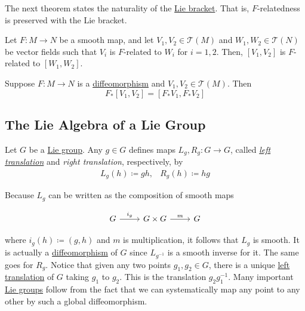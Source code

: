 \documentclass{article}
\newcounter{theorem}[section]
\newcounter{definition}[section]
\begin{document}
    The next theorem states the naturality of the \hyperref[def:lie-bracket]{Lie bracket}. That is, $F$-relatedness is preserved with the Lie bracket. 

    \begin{theorem}
      \label{thm:lie-brackets-respect-f-relatedness}
      Let $F: M \to N$ be a smooth map, and let $V_1, V_2 \in \mathcal{T} (M)$ and $W_1, W_2 \in \mathcal{T}(N)$ be vector fields such that $V_i$ is $F$-related to $W_i$ for $i = 1, 2$. Then, $[V_1, V_2]$ is $F$-related to $[W_1, W_2]$. 
    \end{theorem}

    \begin{corollary}
      \label{thm:diffeomorphisms-preserve-lie-brackets}
      Suppose $F: M \to N$ is a \hyperref[def:diffeomorphism-2]{diffeomorphism} and $V_1, V_2 \in \mathcal{T}(M)$. Then 
        \begin{equation}
          F_* [V_1, V_2] = [F_* V_1, F_* V_2]
        \end{equation}
    \end{corollary}

  \subsection{The Lie Algebra of a Lie Group}

    \begin{definition}
      \label{def:left-and-right-translation}
      Let $G$ be a \hyperref[def:lie-group]{Lie group}. Any $g \in G$ defines maps $L_g, R_g : G \to G$, called \textit{\hyperref[def:left-and-right-translation]{left translation}} and \textit{right translation}, respectively, by 
      \begin{align*}
        L_g (h) \coloneqq g h , & R_g (h) \coloneqq h g
      \end{align*}
    \end{definition}

    Because $L_g$ can be written as the composition of smooth maps 

      \begin{equation}
        \begin{tikzcd}
              G \arrow{r}{i_g} & G \times G \arrow{r}{m} & G
              \end{tikzcd}
      \end{equation}

    where $i_g (h) \coloneqq (g, h)$ and $m$ is multiplication, it follows that $L_g$ is smooth. It is actually a \hyperref[def:diffeomorphism-2]{diffeomorphism} of $G$ since $L_{g^{-1}}$ is a smooth inverse for it. The same goes for $R_g$. Notice that given any two points $g_1, g_2 \in G$, there is a unique \hyperref[def:left-and-right-translation]{left translation} of $G$ taking $g_1$ to $g_2$. This is the translation $g_2 g_1^{-1}$. Many important \hyperref[def:lie-group]{Lie groups} follow from the fact that we can systematically map any point to any other by such a global diffeomorphism. 
\end{document}
